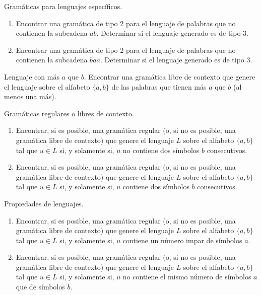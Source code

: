 \documentclass[12pt]{report} %
\begin{document}
\begin{ejercicio}
Gramáticas para lenguajes específicos.

\begin{enumerate}[label=\alph*)]
    \item Encontrar una gramática de tipo 2 para el lenguaje de palabras que no contienen la subcadena $ab$.  
    Determinar si el lenguaje generado es de tipo 3.

    \item Encontrar una gramática de tipo 2 para el lenguaje de palabras que no contienen la subcadena $baa$.  
    Determinar si el lenguaje generado es de tipo 3.
\end{enumerate}

\end{ejercicio}

\begin{ejercicio}
Lenguaje con más $a$ que $b$. Encontrar una gramática libre de contexto que genere el lenguaje sobre el alfabeto $\{a, b\}$ de las palabras que tienen más $a$ que $b$ (al menos una más).
\end{ejercicio}

\begin{ejercicio}
Gramáticas regulares o libres de contexto.

\begin{enumerate}[label=\alph*)]
    \item Encontrar, si es posible, una gramática regular (o, si no es posible, una gramática libre de contexto) que genere el lenguaje $L$ sobre el alfabeto $\{a, b\}$ tal que $u \in L$ si, y solamente si, $u$ no contiene dos símbolos $b$ consecutivos.

    \item Encontrar, si es posible, una gramática regular (o, si no es posible, una gramática libre de contexto) que genere el lenguaje $L$ sobre el alfabeto $\{a, b\}$ tal que $u \in L$ si, y solamente si, $u$ contiene dos símbolos $b$ consecutivos.
\end{enumerate}
\end{ejercicio}

\begin{ejercicio}
Propiedades de lenguajes.

\begin{enumerate}[label=\alph*)]
    \item Encontrar, si es posible, una gramática regular (o, si no es posible, una gramática libre de contexto) que genere el lenguaje $L$ sobre el alfabeto $\{a, b\}$ tal que $u \in L$ si, y solamente si, $u$ contiene un número impar de símbolos $a$.

    \item Encontrar, si es posible, una gramática regular (o, si no es posible, una gramática libre de contexto) que genere el lenguaje $L$ sobre el alfabeto $\{a, b\}$ tal que $u \in L$ si, y solamente si, $u$ no contiene el mismo número de símbolos $a$ que de símbolos $b$.
\end{enumerate}

\end{ejercicio}
\end{document}
